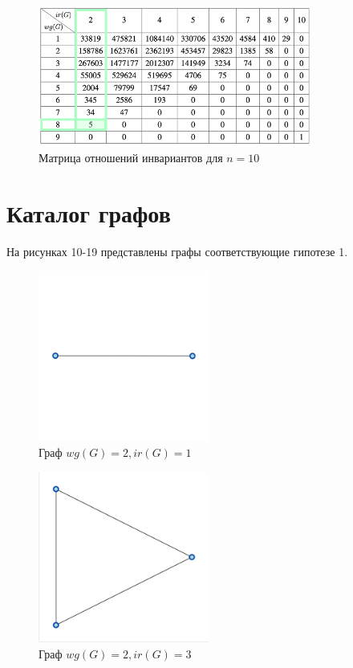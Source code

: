 \documentclass[bachelor, och, nir]{SCWorks}
\begin{document}
\begin{figure}[ht!]  
    \centering 
    \includegraphics[width=0.8\textwidth]
{Group431.png}  
    \caption{Матрица отношений инвариантов для $n = 10$} 
    \label{fig:im9} 
\end{figure}



\section{Каталог графов}
На рисунках 10-19 представлены графы соответствующие гипотезе 1.

\begin{figure}[ht!]  
    \centering 
    \includegraphics[width=0.5\textwidth]
{1.jpeg}  
    \caption{Граф $wg(G) = 2, ir(G) = 1$} 
    \label{fig:im2} 
\end{figure}


\begin{figure}[ht!]  
    \centering 
    \includegraphics[width=0.5\textwidth]
{2.jpeg}  
    \caption{Граф $wg(G) = 2 , ir(G) = 3 $} 
    \label{fig:im2} 
\end{figure}
\end{document}
